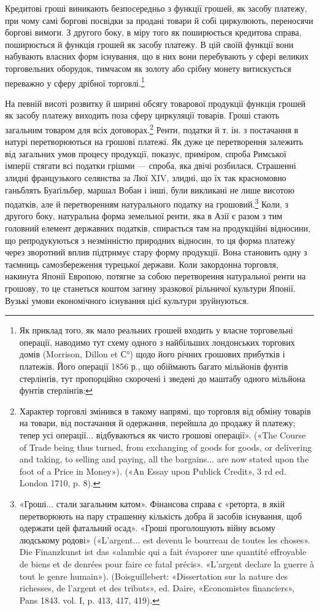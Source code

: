 Кредитові гроші виникають безпосередньо з функції грошей, як засобу платежу, при чому самі боргові
посвідки за продані товари й собі циркулюють, переносячи боргові вимоги. З другого боку, в міру того
як поширюється кредитова справа, поширюється й функція грошей як засобу платежу. В цій своїй функції
вони набувають власних форм існування, що в них вони перебувають у сфері великих торговельних
оборудок, тимчасом як золоту або срібну монету витискується переважно у сферу дрібної торговлі.\footnote{
Як приклад того, як мало реальних грошей входить у власне торговельні операції, наводимо тут
схему одного з найбільших лондонських торгових домів (Morrison, Dillon et С°) щодо його річних
грошових прибутків і платежів. Його операції 1856 р., що обіймають багато мільйонів фунтів
стерлінґів, тут пропорційно скорочені і зведені до маштабу одного мільйона фунтів стерлінґів:
}

На певній висоті розвитку й ширині обсягу товарової продукції функція грошей як засобу платежу
виходить поза сферу циркуляції товарів. Гроші стають загальним товаром для всіх
договорах.\footnote{
Характер торговлі змінився в такому напрямі, що торговля від
обміну товарів на товари, від постачання й одержання, перейшла до продажу
й платежу; тепер усі операції... відбуваються як чисто грошові
операції». («The Course of Trade being thus turned, from exchanging of
goods for goods, or delivering and taking, to selling and paying, all the
bargains... are now stated upon the foot of a Price in Money»). («An Essay
upon Publick Credit», 3 rd ed. London 1710, p. 8).
} Ренти, податки й т. ін. з постачання в натурі перетворюються
на грошові платежі. Як дуже це перетворення
залежить від загальних умов процесу продукції, показує, приміром,
спроба Римської імперії стягати всі податки грішми —
спроба, яка двічі розбилася. Страшенні злидні французького
селянства за Люї XIV, злидні, що їх так красномовно ганьблять
Буаґільбер, маршал Вобан і інші, були викликані не лише висотою
податків, але й перетворенням натурального податку на
грошовий.\footnote{
«Гроші... стали загальним катом». Фінансова справа є «реторта, в
якій перетворюють на пару страшенну кількість добра й засобів існування,
щоб одержати цей фатальний осад». «Гроші проголошують війну всьому
людському родові» («L’argent... est devenu le bourreau de toutes les choses».
Die Finanzkunst ist das «alambic qui a fait évaporer une quantité
effroyable de biens et de denrées pour faire ce fatal précis». «L’argent declare
la guerre à tout le genre humain»). (Boisguillebert: «Dissertation sur la
nature des richesses, de l’argent et des tributs», ed. Daire, «Economistes
financiers», Pans 1843. vol. I, p. 413, 417, 419).
} Коли, з другого боку, натуральна форма земельної
ренти, яка в Азії є разом з тим головний елемент державних
податків, спирається там на продукційні відносини, що репродукуються
з незмінністю природних відносин, то ця форма платежу
через зворотний вплив підтримує стару форму продукції. Вона
становить одну з таємниць самозбереження турецької держави.
Коли закордонна торговля, накинута Японії Европою, потягне
за собою перетворення натуральної ренти на грошову, то це
станеться коштом загину зразкової рільничої культури Японії.
Вузькі умови економічного існування цієї культури зруйнуються.

